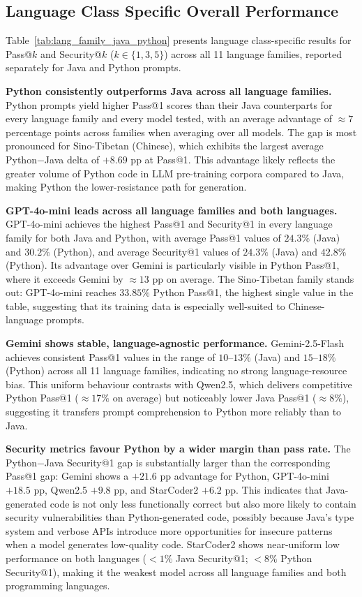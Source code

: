 \documentclass[pdflatex,sn-mathphys-ay]{sn-jnl}
\begin{document}
\subsection{Language Class Specific Overall Performance}

Table~\ref{tab:lang_family_java_python} presents language class-specific results for Pass@$k$ and Security@$k$ ($k \in \{1,3,5\}$) across all 11 language families, reported separately for Java and Python prompts. 

\noindent\textbf{Python consistently outperforms Java across all language families.} Python prompts yield higher Pass@1 scores than their Java counterparts for every language family and every model tested, with an average advantage of ${\approx}7$ percentage points across families when averaging over all models. The gap is most pronounced for Sino-Tibetan (Chinese), which exhibits the largest average Python$-$Java delta of $+8.69$ pp at Pass@1. This advantage likely reflects the greater volume of Python code in LLM pre-training corpora compared to Java, making Python the lower-resistance path for generation.

\noindent\textbf{GPT-4o-mini leads across all language families and both languages.} GPT-4o-mini achieves the highest Pass@1 and Security@1 in every language family for both Java and Python, with average Pass@1 values of $24.3\%$ (Java) and $30.2\%$ (Python), and average Security@1 values of $24.3\%$ (Java) and $42.8\%$ (Python). Its advantage over Gemini is particularly visible in Python Pass@1, where it exceeds Gemini by ${\approx}13$ pp on average. The Sino-Tibetan family stands out: GPT-4o-mini reaches $33.85\%$ Python Pass@1, the highest single value in the table, suggesting that its training data is especially well-suited to Chinese-language prompts.

\noindent\textbf{Gemini shows stable, language-agnostic performance.}
Gemini-2.5-Flash achieves consistent Pass@1 values in the range of $10$--$13\%$ (Java) and $15$--$18\%$ (Python) across all 11 language families, indicating no strong language-resource bias. This uniform behaviour contrasts with Qwen2.5, which delivers competitive Python Pass@1 (${\approx}17\%$ on average) but noticeably lower Java Pass@1 (${\approx}8\%$), suggesting it transfers prompt comprehension to Python more reliably than to Java.

\noindent\textbf{Security metrics favour Python by a wider margin than pass rate.}
The Python$-$Java Security@1 gap is substantially larger than the corresponding Pass@1 gap: Gemini shows a $+21.6$ pp advantage for Python, GPT-4o-mini $+18.5$ pp, Qwen2.5 $+9.8$ pp, and StarCoder2 $+6.2$ pp. This indicates that Java-generated code is not only less functionally correct but also more likely to contain security vulnerabilities than Python-generated code, possibly because Java's type system and verbose APIs introduce more opportunities for insecure patterns when a model generates low-quality code. StarCoder2 shows near-uniform low performance on both languages ($<1\%$ Java Security@1; $<8\%$ Python Security@1), making it the weakest model across all language families and both programming languages.
\end{document}
